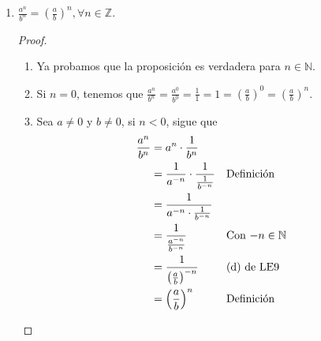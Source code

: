 \documentclass[11pt]{article}
\newcommand{\N}{\mathbb{N}}
\newcommand{\Z}{\mathbb{Z}}
\begin{document}
\begin{enumerate}[label=\alph*)]
  \item $\frac{a^n}{b^n} = \left(\frac{a}{b}\right)^n, \forall n\in \Z$.
  \begin{proof}\leavevmode
    \begin{enumerate}[label=\roman*)]
      \item Ya probamos que la proposición es verdadera para $n\in \N$.
      \item Si $n=0$, tenemos que $\frac{a^n}{b^n} = \frac{a^0}{b^0} = \frac{1}{1} = 1 = \left(\frac{a}{b}\right)^0= \left(\frac{a}{b}\right)^n$.
      \item Sea $a\neq 0$ y $b\neq 0$, si $n<0$, sigue que \begin{align*}
        \frac{a^n}{b^n} &= a^n \cdot \frac{1}{b^n}\\
        &= \frac{1}{a^{-n}} \cdot \frac{1}{\frac{1}{b^{-n}}} && \text{Definición}\\
        &= \frac{1}{a^{-n}\cdot \frac{1}{b^{-n}}}\\
        &= \frac{1}{\frac{a^{-n}}{b^{-n}}} && \text{Con $-n\in \N$}\\
        &= \frac{1}{\left(\frac{a}{b}\right)^{-n}} && \text{(d) de LE9}\\
        &= \left(\frac{a}{b}\right)^n && \text{Definición} \qedhere
      \end{align*}
    \end{enumerate}
  \end{proof}


\end{enumerate}
\end{document}
